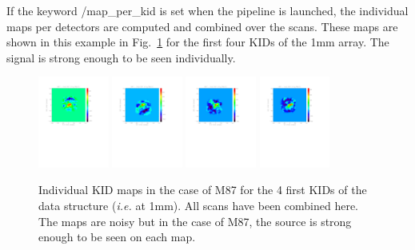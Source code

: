 \documentclass[a4paper]{article}
\begin{document}
If the keyword {\color{blue} /map\_per\_kid} is set when the pipeline is launched, the individual maps per detectors are computed and combined over the scans. These maps are shown in this example in Fig.~\ref{fig:M87_map_per_KID} for the first four KIDs of the 1mm array. The signal is strong enough to be seen individually.
\begin{figure}
\centering
\includegraphics[height=3cm, trim=2cm 13cm 4cm 2cm, clip=true]{Figure/M87_mapKID1}
\includegraphics[height=3cm, trim=2cm 13cm 4cm 2cm, clip=true]{Figure/M87_mapKID2}
\includegraphics[height=3cm, trim=2cm 13cm 4cm 2cm, clip=true]{Figure/M87_mapKID3}
\includegraphics[height=3cm, trim=2cm 13cm 4cm 2cm, clip=true]{Figure/M87_mapKID4}
\caption{Individual KID maps in the case of M87 for the 4 first KIDs of the data structure ({\it i.e.} at 1mm). All scans have been combined here. The maps are noisy but in the case of M87, the source is strong enough to be seen on each map.}
\label{fig:M87_map_per_KID}
\end{figure}
\end{document}
